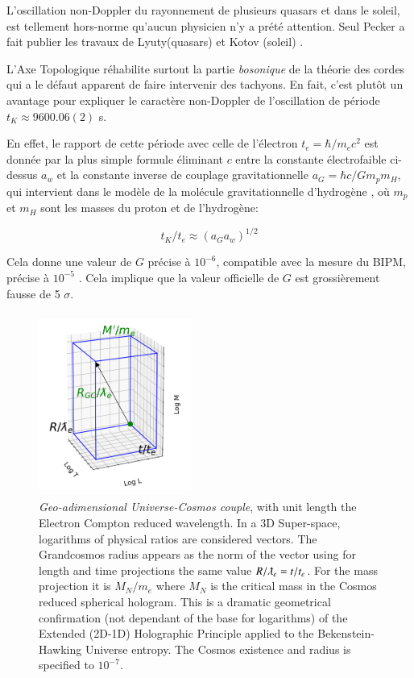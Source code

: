 \documentclass[a4paper,9pt]{article}
\begin{document}
L'oscillation non-Doppler du rayonnement de plusieurs quasars et dans le soleil, est tellement hors-norme qu'aucun physicien n'y a prété attention. Seul Pecker a fait publier les travaux de Lyuty(quasars) et Kotov (soleil)  \cite{Kotov1}.

L'Axe Topologique réhabilite surtout la partie \textit{bosonique} de la théorie des cordes qui a le défaut apparent de faire intervenir des tachyons. En fait, c'est plutôt un avantage pour expliquer le caractère non-Doppler de l'oscillation \cite{Kotov2} de période $t_K \approx 9600.06(2)$ s. 


En effet, le rapport de cette période avec celle de l’électron $t_e = \hbar/m_ec^2$ est donnée par la plus simple formule éliminant $c$ entre la constante électrofaible ci-dessus $a_w$ et la constante inverse de couplage gravitationnelle $a_G = \hbar c/G m_p m_H$, qui intervient dans le modèle de la molécule gravitationnelle d’hydrogène \cite{Sanchez2}, où $m_p$ et $m_H$ sont les masses du proton et de l’hydrogène: 

\begin{equation}
t_K /t_e   \approx  (a_G a_w)^{1/2}
\end{equation}


Cela donne une valeur de $G$ précise à $10^{-6}$, compatible avec la mesure du BIPM, précise à $10^{-5}$ \cite {Quinn}. Cela implique que la valeur officielle de $G$ est grossièrement fausse de 5 $\sigma$.



\begin{figure}
\centering
\includegraphics[width=5cm,height=6cm]{./figure/triaxis.png}
\caption[MLT Adimensional cuboid]{\textit{Geo-adimensional Universe-Cosmos couple}, with unit length the Electron Compton reduced wavelength. 
In a 3D Super-space, logarithms of physical ratios are considered vectors. The Grandcosmos radius appears as the norm of the vector using for length and time projections the same value $R/\lambdabar_e = t/t_e$. For the mass projection it is $M_N/m_e$ where
$M_N$ is the critical mass in the Cosmos reduced spherical hologram. This is a dramatic geometrical confirmation (not dependant of the base for logarithms) of the Extended (2D-1D) Holographic Principle applied to the Bekenstein-Hawking Universe entropy. The Cosmos existence and radius is specified to $10^{-7}$.} 
\end{figure}
\end{document}
